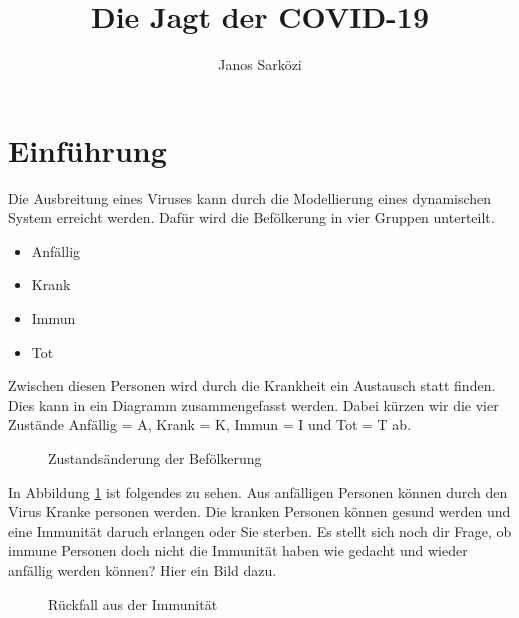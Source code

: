 \documentclass[11pt, a4paper]{article}
\begin{document}
\begin{titlepage}
    \title{Die Jagt der COVID-19}
    \author{Janos Sarközi}
    \maketitle
\end{titlepage}

\section{Einführung}

Die Ausbreitung eines Viruses kann durch die Modellierung eines dynamischen System erreicht
werden. Dafür wird die Befölkerung in vier Gruppen unterteilt.

\begin{itemize}[itemsep=0pt]
    \item Anfällig
    \item Krank
    \item Immun
    \item Tot
\end{itemize}

Zwischen diesen Personen wird durch die Krankheit ein Austausch statt finden. Dies kann
in ein Diagramm zusammengefasst werden. Dabei kürzen wir die vier Zustände Anfällig = A,
Krank = K, Immun = I und Tot = T ab.

\begin{figure}[h]
\centering
{}
\caption{Zustandsänderung der Befölkerung}
\label{fig:sird}
\end{figure}

In Abbildung \ref{fig:sird} ist folgendes zu sehen. Aus anfälligen Personen können durch
den Virus Kranke personen werden. Die kranken Personen können gesund werden und eine
Immunität daruch erlangen oder Sie sterben. Es stellt sich noch dir Frage, ob immune
Personen doch nicht die Immunität haben wie gedacht und wieder anfällig werden können?
Hier ein Bild dazu.

\begin{figure}[h]
\centering
{}
\caption{Rückfall aus der Immunität}
\label{fig:noImmune}
\end{figure}
\end{document}
